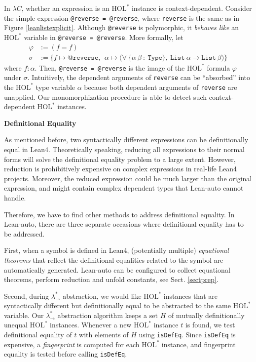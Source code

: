   In $\lambda C$, whether an expression is an $\text{HOL}^*$ instance is context-dependent.
Consider the simple expression \texttt{@reverse = @reverse}, where \texttt{reverse}
is the same as in Figure \ref{leanlistexplicit}. Although \texttt{@reverse} is polymorphic,
it \textit{behaves like} an $\text{HOL}^*$ variable in \texttt{@reverse = @reverse}. More formally,
let
$$\begin{aligned}
\varphi &:= (f = f) \\
\sigma  &:= \{f \mapsto \texttt{@reverse}, \ \ \alpha \mapsto \texttt{(} \forall \ \texttt{\{}\alpha \ \beta \ : \ \texttt{Type\}}, \ 
  \texttt{List} \ \alpha \to \texttt{List} \ \beta \texttt{)}\}
\end{aligned}$$
where $f : \alpha$. Then, \texttt{@reverse = @reverse} is the image of the $\text{HOL}^*$ formula $\varphi$
under $\sigma$. Intuitively, the dependent arguments of \texttt{reverse} can be ``absorbed''
into the $\text{HOL}^*$ type variable $\alpha$ because both dependent arguments of \texttt{reverse} are unapplied.
Our monomorphization procedure is able to detect such context-dependent $\text{HOL}^*$ instances.

\noindent \textbf{Definitional Equality}

  As mentioned before, two syntactically different expressions can be definitionally
equal in Lean4. Theoretically speaking, reducing all expressions to their normal forms will solve
the definitional equality problem to a large extent. However, reduction is prohibitively
expensive on complex expressions in real-life Lean4 projects. Moreover, the reduced expression
could be much larger than the original expression, and might contain complex dependent types
that Lean-auto cannot handle. %

  Therefore, we have to find other methods to address definitional equality.
In Lean-auto, there are three separate occasions where definitional equality
has to be addressed.

  First, when a symbol is defined in Lean4, (potentially multiple) \textit{equational theorems} that
reflect the definitional equalities related to the symbol are automatically generated.
Lean-auto can be configured to collect equational theorems, perform reduction and
unfold constants, see Sect. \ref{sectprep}.

  Second, during $\lambda_\to^*$ abstraction, we would like $\text{HOL}^*$ instances
that are syntactically different but definitionally equal to be abstracted to the
same $\text{HOL}^*$ variable. Our $\lambda_\to^*$ abstraction algorithm keeps a
set $H$ of mutually definitionally unequal $\text{HOL}^*$ instances. Whenever a new $\text{HOL}^*$
instance $t$ is found, we test definitional equality of $t$ with elements of $H$
using \texttt{isDefEq}. Since \texttt{isDefEq} is expensive,
a \textit{fingerprint} is computed for each $\text{HOL}^*$ instance, and fingerprint equality
is tested before calling \texttt{isDefEq}.

